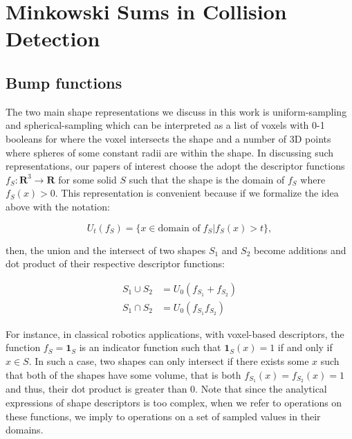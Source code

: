 \documentclass[letterpaper, 10 pt, conference]{ieeeconf}
\begin{document}
\section{Minkowski Sums in Collision Detection}

\subsection{Bump functions}

The two main shape representations we discuss in this work is uniform-sampling and
spherical-sampling which can be interpreted as a list of voxels with 0-1 booleans
for where the voxel intersects the shape and a number of 3D points where spheres
of some constant radii are within the shape. In discussing such representations,
our papers of interest \cite{behandish2016analytic, lysenko2013fourier} choose the adopt 
the descriptor functions $f_S: \mathbf{R}^3 \rightarrow \mathbf{R}$ for
some solid $S$ such that the shape is the domain of $f_S$ where $f_S(x) > 0$. 
This representation is convenient because if we formalize the idea above with
the notation:

\begin{equation}
 U_t(f_S) = \{x \in \text{domain of} \; f_S | f_S(x) > t\},
\end{equation}

then, the union and the intersect of two shapes $S_1$ and $S_2$ become additions and 
dot product of their respective descriptor functions:

\begin{align}
 S_1 \cup S_2 &= U_0(f_{S_1} + f_{S_2}) \\
 S_1 \cap S_2 &= U_0(f_{S_1}f_{S_2})
\end{align}

For instance,
in classical robotics applications, with voxel-based descriptors, the function
$f_S = \mathbf{1}_S$ is an indicator function such that $\mathbf{1}_S(x) = 1$
if and only if $x \in S$. In such a case, two shapes can only intersect if there
exists some $x$ such that both of the shapes have some volume, that is
both $f_{S_1}(x) = f_{S_2}(x) = 1$ and thus, their dot product is greater than 0.
Note that since the analytical expressions of shape descriptors is too complex,
when we refer to operations on these functions, we imply to operations on a set of sampled
values in their domains. 
\end{document}
